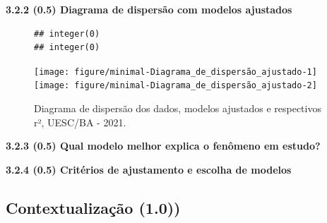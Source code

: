 \documentclass[12pt]{article}\usepackage[]{graphicx}\usepackage[]{color}
\makeatletter
\newenvironment{kframe}{%
 \def\at@end@of@kframe{}%
 \ifinner\ifhmode%
  \def\at@end@of@kframe{\end{minipage}}%
  \begin{minipage}{\columnwidth}%
 \fi\fi%
 \def\FrameCommand##1{\hskip\@totalleftmargin \hskip-\fboxsep
 \colorbox{shadecolor}{##1}\hskip-\fboxsep
     \hskip-\linewidth \hskip-\@totalleftmargin \hskip\columnwidth}%
 \MakeFramed {\advance\hsize-\width
   \@totalleftmargin\z@ \linewidth\hsize
   \@setminipage}}%
 {\par\unskip\endMakeFramed%
 \at@end@of@kframe}
\newenvironment{knitrout}{}{} %
\makeatother
\begin{document}
  \textbf{3.2.2 (0.5) Diagrama de dispersão com modelos ajustados}
  
\begin{figure}[!h]
\label{figura:Diagrama de dispersão_ajustado}
\begin{knitrout}
\color{fgcolor}\begin{kframe}
\begin{verbatim}
## integer(0)
## integer(0)
\end{verbatim}
\end{kframe}

{\centering \texttt{[image: figure/minimal-Diagrama\_de\_dispersão\_ajustado-1]} 
\texttt{[image: figure/minimal-Diagrama\_de\_dispersão\_ajustado-2]} 

}


\end{knitrout}
\caption{Diagrama de dispersão dos dados, modelos ajustados e respectivos r², UESC/BA - 2021.}
\end{figure}
  \textbf{3.2.3 (0.5) Qual modelo melhor explica o fenômeno em estudo?}
  
  \textbf{3.2.4 (0.5) Critérios de ajustamento e escolha de modelos}
           
\subsection{ Contextualização (1.0))}
\end{document}
